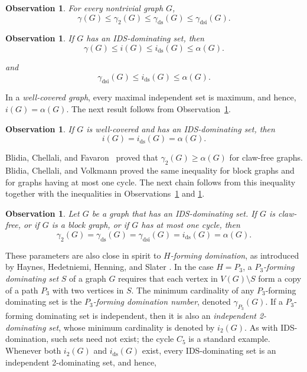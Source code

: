 \documentclass[11pt]{article}
\newtheorem{observation}[theorem]{Observation}
\theoremstyle{definition}
\theoremstyle{remark}
\newcommand{\ds}{\mathrm{ds}}
\newcommand{\dsi}{\mathrm{dsi}}
\begin{document}
\begin{observation}
\label{obs:basic-chain}
For every nontrivial graph \(G\),
\[
   \gamma(G)\le \gamma_2(G)\le \gamma_{\ds}(G)\le \gamma_{\dsi}(G).
\]
\end{observation}

\begin{observation}
\label{obs:ids-chain}
If \(G\) has an IDS-dominating set, then
\[
   \gamma(G)\le i(G)\le i_{\ds}(G)\le \alpha(G).
\]

and
\[
   \gamma_{\dsi}(G)\le i_{\ds}(G)\le \alpha(G).
\]
\end{observation}

In a \emph{well-covered graph}, every maximal independent set is maximum, and hence, 
\(i(G)=\alpha(G)\).  The next  result follows from 
Observation~\ref{obs:ids-chain}.

\begin{observation}
\label{obs:well-covered-ids}
If \(G\) is well-covered and has an IDS-dominating set, then
\[
   i(G)=i_{\ds}(G)=\alpha(G).
\]
\end{observation}




Blidia, Chellali, and Favaron~\cite{Blidia06} proved that
\(\gamma_2(G)\ge \alpha(G)\) for claw-free graphs. Blidia, Chellali, and
Volkmann \cite{BlidiaChellaliVolkmann06} proved the same inequality for
block graphs and for graphs having at most one cycle. The next chain follows from this inequality together with the inequalities in
 Observations~\ref{obs:basic-chain} and \ref{obs:ids-chain}.


\begin{observation}
\label{obs:alpha-equality-classes}
Let \(G\) be a graph that has an IDS-dominating set. If \(G\) is claw-free,
or if \(G\) is a block graph, or if \(G\) has at most one cycle, then
\[
   \gamma_2(G)=\gamma_{\ds}(G)=\gamma_{\dsi}(G)=i_{\ds}(G)=\alpha(G).
\]
\end{observation}




These parameters are also close in spirit to \emph{\(H\)-forming domination}, as
introduced by Haynes, Hedetniemi, Henning, and Slater \cite{HHHS}. In the
case \(H=P_3\), a \emph{\(P_3\)-forming dominating set} \(S\)  of a graph \(G\) requires that each vertex in \(V(G) \setminus S\) form a copy of a path \(P_3\) with two vertices in \(S\).  The minimum cardinality of any $P_3$-forming dominating set is the \emph{$P_3$-forming domination number}, denoted  \(\gamma_{P_3}(G)\). If a \(P_3\)-forming dominating set is independent, then it is also an \emph{independent 2-dominating set}, whose
minimum cardinality is  denoted by \(i_2(G)\).  As with IDS-domination, such sets need not
exist; the cycle \(C_5\) is a standard example. Whenever both \(i_2(G)\)
and \(i_{\ds}(G)\) exist, every IDS-dominating set is an independent
2-dominating set, and hence,
\end{document}
